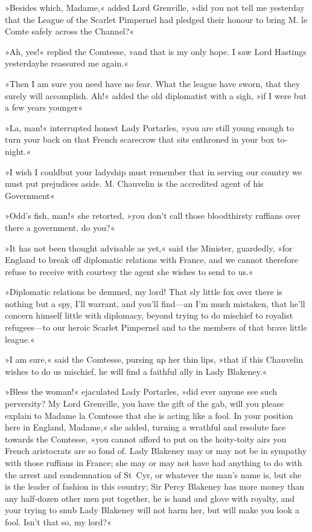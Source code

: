 »Besides which, Madame,« added Lord Grenville, »did you not tell me yesterday that the League of the Scarlet Pimpernel had pledged their honour to bring M. le Comte safely across the Channel?«

»Ah, yes!« replied the Comtesse, »and that is my only hope. I saw Lord Hastings yesterday\textellipsis \allowbreak  he reassured me again.«

»Then I am sure you need have no fear. What the league have sworn, that they surely will accomplish. Ah!« added the old diplomatist with a sigh, »if I were but a few years younger\textellipsis«

»La, man!« interrupted honest Lady Portarles, »you are still young enough to turn your back on that French scarecrow that sits enthroned in your box to-night.«

»I wish I could\textellipsis \allowbreak  but your ladyship must remember that in serving our country we must put prejudices aside. M. Chauvelin is the accredited agent of his Government\textellipsis«

»Odd's fish, man!« she retorted, »you don't call those bloodthirsty ruffians over there a government, do you?«

»It has not been thought advisable as yet,« said the Minister, guardedly, »for England to break off diplomatic relations with France, and we cannot therefore refuse to receive with courtesy the agent she wishes to send to us.«

»Diplomatic relations be demmed, my lord! That sly little fox over there is nothing but a spy, I'll warrant, and you'll find—an I'm much mistaken, that he'll concern himself little with diplomacy, beyond trying to do mischief to royalist refugees—to our heroic Scarlet Pimpernel and to the members of that brave little league.«

»I am sure,« said the Comtesse, pursing up her thin lips, »that if this Chauvelin wishes to do us mischief, he will find a faithful ally in Lady Blakeney.«

»Bless the woman!« ejaculated Lady Portarles, »did ever anyone see such perversity? My Lord Grenville, you have the gift of the gab, will you please explain to Madame la Comtesse that she is acting like a fool. In your position here in England, Madame,« she added, turning a wrathful and resolute face towards the Comtesse, »you cannot afford to put on the hoity-toity airs you French aristocrats are so fond of. Lady Blakeney may or may not be in sympathy with those ruffians in France; she may or may not have had anything to do with the arrest and condemnation of St~Cyr, or whatever the man's name is, but she is the leader of fashion in this country; Sir Percy Blakeney has more money than any half-dozen other men put together, he is hand and glove with royalty, and your trying to snub Lady Blakeney will not harm her, but will make you look a fool. Isn't that so, my lord?«

